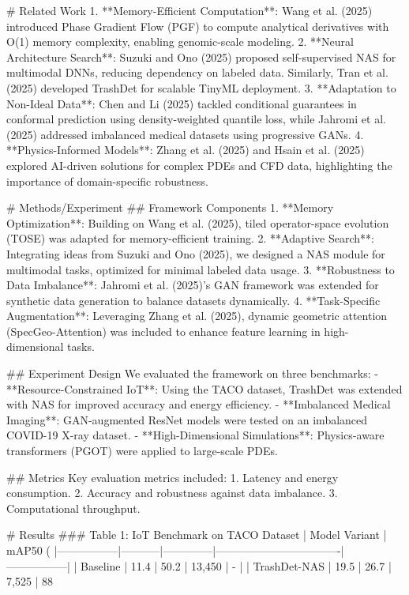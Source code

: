 # Related Work  
1. **Memory-Efficient Computation**: Wang et al. (2025) introduced Phase Gradient Flow (PGF) to compute analytical derivatives with O(1) memory complexity, enabling genomic-scale modeling.  
2. **Neural Architecture Search**: Suzuki and Ono (2025) proposed self-supervised NAS for multimodal DNNs, reducing dependency on labeled data. Similarly, Tran et al. (2025) developed TrashDet for scalable TinyML deployment.  
3. **Adaptation to Non-Ideal Data**: Chen and Li (2025) tackled conditional guarantees in conformal prediction using density-weighted quantile loss, while Jahromi et al. (2025) addressed imbalanced medical datasets using progressive GANs.  
4. **Physics-Informed Models**: Zhang et al. (2025) and Hsain et al. (2025) explored AI-driven solutions for complex PDEs and CFD data, highlighting the importance of domain-specific robustness.  

# Methods/Experiment  
## Framework Components  
1. **Memory Optimization**: Building on Wang et al. (2025), tiled operator-space evolution (TOSE) was adapted for memory-efficient training.  
2. **Adaptive Search**: Integrating ideas from Suzuki and Ono (2025), we designed a NAS module for multimodal tasks, optimized for minimal labeled data usage.  
3. **Robustness to Data Imbalance**: Jahromi et al. (2025)’s GAN framework was extended for synthetic data generation to balance datasets dynamically.  
4. **Task-Specific Augmentation**: Leveraging Zhang et al. (2025), dynamic geometric attention (SpecGeo-Attention) was included to enhance feature learning in high-dimensional tasks.  

## Experiment Design  
We evaluated the framework on three benchmarks:  
- **Resource-Constrained IoT**: Using the TACO dataset, TrashDet was extended with NAS for improved accuracy and energy efficiency.  
- **Imbalanced Medical Imaging**: GAN-augmented ResNet models were tested on an imbalanced COVID-19 X-ray dataset.  
- **High-Dimensional Simulations**: Physics-aware transformers (PGOT) were applied to large-scale PDEs.  

## Metrics  
Key evaluation metrics included:  
1. Latency and energy consumption.  
2. Accuracy and robustness against data imbalance.  
3. Computational throughput.  

# Results  
### Table 1: IoT Benchmark on TACO Dataset  
| Model Variant   | mAP50 (%
|-----------------|-----------|--------------|----------------------------------|-----------------|  
| Baseline        | 11.4      | 50.2         | 13,450                          | -               |  
| TrashDet-NAS    | 19.5      | 26.7         | 7,525                            | 88%

